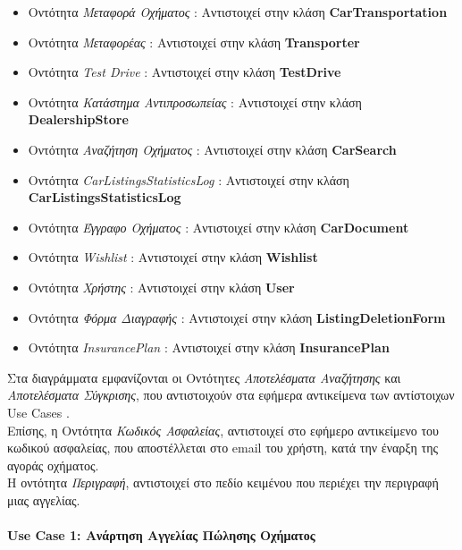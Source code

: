 \documentclass{../ol-softwaremanual}
\begin{document}
\begin{itemize}
		\item Οντότητα \textit{Μεταφορά Οχήματος} : Αντιστοιχεί στην κλάση \en \textbf{CarTransportation}\gr
		\item Οντότητα \textit{Μεταφορέας} : Αντιστοιχεί στην κλάση \en \textbf{Transporter}\gr
		\item Οντότητα \en \textit{Test Drive} \gr : Αντιστοιχεί στην κλάση \en \textbf{TestDrive}\gr
		\item Οντότητα \textit{Κατάστημα Αντιπροσωπείας} : Αντιστοιχεί στην κλάση \en \textbf{DealershipStore}\gr
		\item Οντότητα \textit{Αναζήτηση Οχήματος} : Αντιστοιχεί στην κλάση \en \textbf{CarSearch} \gr
		\item Οντότητα \en \textit{CarListingsStatisticsLog} \gr : Αντιστοιχεί στην κλάση \en \textbf{CarListingsStatisticsLog} \gr		
		\item Οντότητα \textit{Έγγραφο Οχήματος} : Αντιστοιχεί στην κλάση \en \textbf{CarDocument} \gr
		\item Οντότητα \en \textit{Wishlist} \gr : Αντιστοιχεί στην κλάση \en \textbf{Wishlist} \gr
		\item Οντότητα  \textit{Χρήστης} : Αντιστοιχεί στην κλάση \en \textbf{User} \gr
		\item Οντότητα \textit{Φόρμα Διαγραφής} : Αντιστοιχεί στην κλάση \en \textbf{ListingDeletionForm} \gr
		\item Οντότητα \en \textit{InsurancePlan} \gr : Αντιστοιχεί στην κλάση \en \textbf{InsurancePlan} \gr

	\end{itemize}
	
	Στα διαγράμματα εμφανίζονται οι Οντότητες \textit{Αποτελέσματα Αναζήτησης} και \textit{Αποτελέσματα Σύγκρισης}, που αντιστοιχούν στα εφήμερα αντικείμενα των αντίστοιχων \en  Use Cases \gr. \\
	
	Επίσης, η Οντότητα \textit{Κωδικός Ασφαλείας}, αντιστοιχεί στο εφήμερο αντικείμενο του κωδικού ασφαλείας, που αποστέλλεται στο \en email \gr του χρήστη, κατά την έναρξη της αγοράς οχήματος. \\
	
	Η οντότητα \textit{Περιγραφή}, αντιστοιχεί στο πεδίο κειμένου που περιέχει την περιγραφή μιας αγγελίας.
	
	
	\newpage
	
	\paragraph{\en Use Case 1: \gr Ανάρτηση Αγγελίας Πώλησης Οχήματος}
	\centering
	
\end{document}
